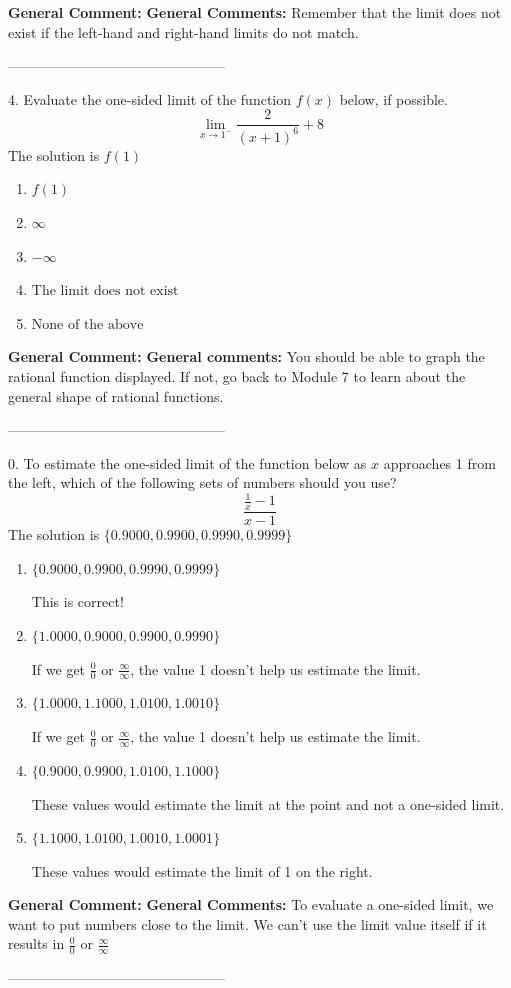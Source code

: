 \documentclass{extbook}[14pt]
\begin{document}
\textbf{General Comment:} \textbf{General Comments:} Remember that the limit does not exist if the left-hand and right-hand limits do not match. 

-----------------------------------------------

4. Evaluate the one-sided limit of the function $f(x)$ below, if possible.
\[ \lim_{x \rightarrow 1^-} \frac{2}{(x+1)^6}+8 \] 
The solution is $ f(1) $ 

\begin{enumerate}[label=\Alph*.] 
\item $ f(1) $ 

  
\item $ \infty $ 

  
\item $ -\infty $ 

  
\item $ \text{The limit does not exist} $ 

  
\item $ \text{None of the above} $ 

  
\end{enumerate} 
 
\textbf{General Comment:} \textbf{General comments:} You should be able to graph the rational function displayed. If not, go back to Module 7 to learn about the general shape of rational functions. 

-----------------------------------------------

0. To estimate the one-sided limit of the function below as $x$ approaches 1 from the left, which of the following sets of numbers should you use?
\[ \frac{\frac{1}{x} - 1}{x - 1} \] 
The solution is $ \{ 0.9000, 0.9900, 0.9990, 0.9999 \} $ 

\begin{enumerate}[label=\Alph*.] 
\item $ \{ 0.9000, 0.9900, 0.9990, 0.9999 \} $ 

 This is correct! 
\item $ \{ 1.0000, 0.9000, 0.9900, 0.9990 \} $ 

 If we get $\frac{0}{0}$ or $\frac{\infty}{\infty}$, the value 1 doesn't help us estimate the limit. 
\item $ \{ 1.0000, 1.1000, 1.0100, 1.0010 \} $ 

 If we get $\frac{0}{0}$ or $\frac{\infty}{\infty}$, the value 1 doesn't help us estimate the limit. 
\item $ \{ 0.9000, 0.9900, 1.0100, 1.1000 \} $ 

 These values would estimate the limit at the point and not a one-sided limit. 
\item $ \{ 1.1000, 1.0100, 1.0010, 1.0001 \} $ 

 These values would estimate the limit of 1 on the right. 
\end{enumerate} 
 
\textbf{General Comment:} \textbf{General Comments:} To evaluate a one-sided limit, we want to put numbers close to the limit. We can't use the limit value itself if it results in $\frac{0}{0}$ or $\frac{\infty}{\infty}$ 

-----------------------------------------------
\end{document}
